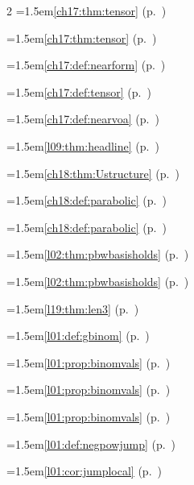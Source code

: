 \begin{multicols}{2}
\hangindent=1.5em\quad \ref{ch17:thm:tensor} (p.~\pageref{ch17:thm:tensor})\par
\hangindent=1.5em\quad \ref{ch17:thm:tensor} (p.~\pageref{ch17:thm:tensor})\par
\hangindent=1.5em\quad \ref{ch17:def:nearform} (p.~\pageref{ch17:def:nearform})\par
\hangindent=1.5em\quad \ref{ch17:def:tensor} (p.~\pageref{ch17:def:tensor})\par
\hangindent=1.5em\quad \ref{ch17:def:nearvoa} (p.~\pageref{ch17:def:nearvoa})\par
\hangindent=1.5em\quad \ref{l09:thm:headline} (p.~\pageref{l09:thm:headline})\par
\hangindent=1.5em\quad \ref{ch18:thm:Ustructure} (p.~\pageref{ch18:thm:Ustructure})\par
\hangindent=1.5em\quad \ref{ch18:def:parabolic} (p.~\pageref{ch18:def:parabolic})\par
\hangindent=1.5em\quad \ref{ch18:def:parabolic} (p.~\pageref{ch18:def:parabolic})\par
\hangindent=1.5em\quad \ref{l02:thm:pbwbasisholds} (p.~\pageref{l02:thm:pbwbasisholds})\par
\hangindent=1.5em\quad \ref{l02:thm:pbwbasisholds} (p.~\pageref{l02:thm:pbwbasisholds})\par
\hangindent=1.5em\quad \ref{l19:thm:len3} (p.~\pageref{l19:thm:len3})\par
\hangindent=1.5em\quad \ref{l01:def:gbinom} (p.~\pageref{l01:def:gbinom})\par
\hangindent=1.5em\quad \ref{l01:prop:binomvals} (p.~\pageref{l01:prop:binomvals})\par
\hangindent=1.5em\quad \ref{l01:prop:binomvals} (p.~\pageref{l01:prop:binomvals})\par
\hangindent=1.5em\quad \ref{l01:prop:binomvals} (p.~\pageref{l01:prop:binomvals})\par
\hangindent=1.5em\quad \ref{l01:def:negpowjump} (p.~\pageref{l01:def:negpowjump})\par
\hangindent=1.5em\quad \ref{l01:cor:jumplocal} (p.~\pageref{l01:cor:jumplocal})\par

\end{multicols}
